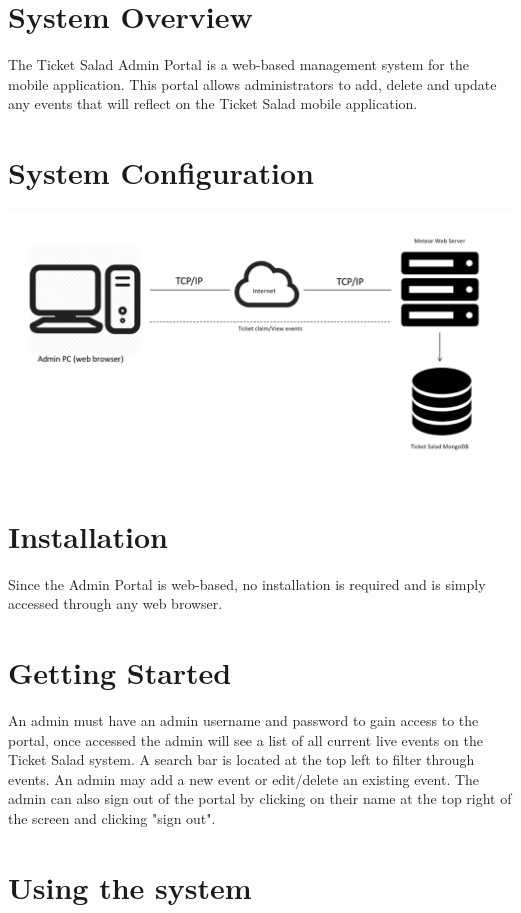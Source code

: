 \documentclass[11pt]{article}
\begin{document}
		\newpage
		\tableofcontents
	\newpage

	\section{System Overview}
	The Ticket Salad Admin Portal is a web-based management system for the mobile application. This portal allows administrators to add, delete and update any events that will reflect on the Ticket Salad mobile application.
	
	\section{System Configuration}
	\includegraphics[width=\linewidth]{diagram.png}
	\section{Installation}
	
	Since the Admin Portal is web-based, no installation is required and is simply accessed through any web browser.
	
	\section{Getting Started}
	An admin must have an admin username and password to gain access to the portal, once accessed the admin will see a list of all current live events on the Ticket Salad system. A search bar is located at the top left to filter through events. An admin may add a new event or edit/delete an existing event. The admin can also sign out of the portal by clicking on their name at the top right of the screen and clicking "sign out".
	\\
	\pagebreak

	\section{Using the system}
\end{document}
